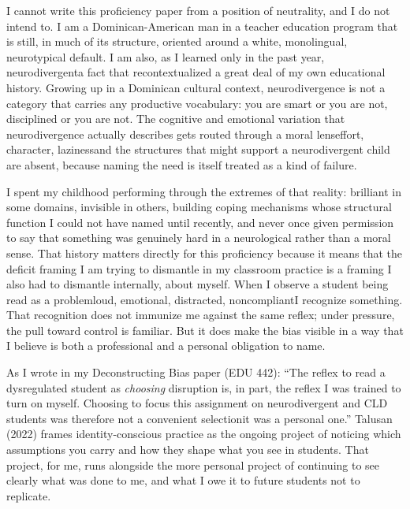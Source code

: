\documentclass[12pt]{article}
\begin{document}
\newpage

I cannot write this proficiency paper from a position of neutrality, and I do not intend to. I am a Dominican-American man in a teacher education program that is still, in much of its structure, oriented around a white, monolingual, neurotypical default. I am also, as I learned only in the past year, neurodivergent\textemdash{}a fact that recontextualized a great deal of my own educational history. Growing up in a Dominican cultural context, neurodivergence is not a category that carries any productive vocabulary: you are smart or you are not, disciplined or you are not. The cognitive and emotional variation that neurodivergence actually describes gets routed through a moral lens\textemdash{}effort, character, laziness\textemdash{}and the structures that might support a neurodivergent child are absent, because naming the need is itself treated as a kind of failure.

I spent my childhood performing through the extremes of that reality: brilliant in some domains, invisible in others, building coping mechanisms whose structural function I could not have named until recently, and never once given permission to say that something was genuinely hard in a neurological rather than a moral sense. That history matters directly for this proficiency because it means that the deficit framing I am trying to dismantle in my classroom practice is a framing I also had to dismantle internally, about myself. When I observe a student being read as a problem\textemdash{}loud, emotional, distracted, noncompliant\textemdash{}I recognize something. That recognition does not immunize me against the same reflex; under pressure, the pull toward control is familiar. But it does make the bias visible in a way that I believe is both a professional and a personal obligation to name.

As I wrote in my Deconstructing Bias paper (EDU 442): ``The reflex to read a dysregulated student as \textit{choosing} disruption is, in part, the reflex I was trained to turn on myself. Choosing to focus this assignment on neurodivergent and CLD students was therefore not a convenient selection\textemdash{}it was a personal one.'' Talusan (2022) frames identity-conscious practice as the ongoing project of noticing which assumptions you carry and how they shape what you see in students. That project, for me, runs alongside the more personal project of continuing to see clearly what was done to me, and what I owe it to future students not to replicate.
\end{document}
